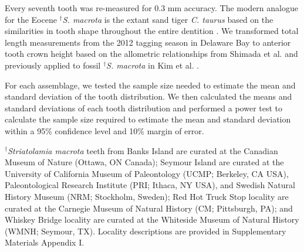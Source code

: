 \documentclass[]{rsos}%
\begin{document}
Every seventh tooth was re-measured for 0.3 mm accuracy. 
The modern analogue for the Eocene ${}^\dag$\emph{S. macrota} is the extant sand tiger \emph{C. taurus} based on the similarities in tooth shape throughout the entire dentition \cite{Cunningham2000}. 
We transformed total length measurements from the 2012 tagging season in Delaware Bay \cite{haulsee2018spatial, Teter2015} to anterior tooth crown height based on the allometric relationships from Shimada et al. \cite{Shimada2004} and previously applied to fossil ${}^\dag$\emph{S. macrota} in Kim et al. \cite{Kim2020}. %

For each assemblage, we tested the sample size needed to estimate the mean and standard deviation of the tooth distribution. 
We then calculated the means and standard deviations of each tooth distribution and performed a power test to calculate the sample size required to estimate the mean and standard deviation within a 95\% confidence level and 10\% margin of error. 

${}^\dag$\emph{Striatolamia macrota} teeth from Banks Island are curated at the Canadian Museum of Nature (Ottawa, ON Canada); Seymour Island are curated at the University of California Museum of Paleontology (UCMP; Berkeley, CA USA), Paleontological Research Institute (PRI; Ithaca, NY USA), and Swedish Natural History Museum (NRM; Stockholm, Sweden); Red Hot Truck Stop locality are curated at the Carnegie Museum of Natural History (CM; Pittsburgh, PA); and Whiskey Bridge locality are curated at the Whiteside Museum of Natural History (WMNH; Seymour, TX). 
Locality descriptions are provided in Supplementary Materials Appendix I.
\end{document}
